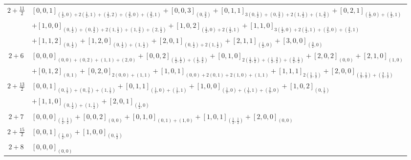 \documentclass[12pt]{article}
\begin{document}
\begin{longtable}{|c|p{}|}
\hline
$2+\frac{11}{2}$ & $[0,0,1]_{(\frac{1}{2},0)+2(\frac{1}{2},1)+(\frac{1}{2},2)+(\frac{3}{2},0)+(\frac{3}{2},1)}+[0,0,3]_{(0,\frac{3}{2})}+[0,1,1]_{3(0,\frac{1}{2})+(0,\frac{3}{2})+2(1,\frac{1}{2})+(1,\frac{3}{2})}+[0,2,1]_{(\frac{1}{2},0)+(\frac{1}{2},1)}$ \\
& $+[1,0,0]_{(0,\frac{1}{2})+(0,\frac{3}{2})+2(1,\frac{1}{2})+(1,\frac{3}{2})+(2,\frac{1}{2})}+[1,0,2]_{(\frac{1}{2},0)+2(\frac{1}{2},1)}+[1,1,0]_{3(\frac{1}{2},0)+2(\frac{1}{2},1)+(\frac{3}{2},0)+(\frac{3}{2},1)}$ \\
& $+[1,1,2]_{(0,\frac{1}{2})}+[1,2,0]_{(0,\frac{1}{2})+(1,\frac{1}{2})}+[2,0,1]_{(0,\frac{1}{2})+2(1,\frac{1}{2})}+[2,1,1]_{(\frac{1}{2},0)}+[3,0,0]_{(\frac{3}{2},0)}$ \\
\hline
$2+6$ & $[0,0,0]_{(0,0)+(0,2)+(1,1)+(2,0)}+[0,0,2]_{(\frac{1}{2},\frac{1}{2})+(\frac{1}{2},\frac{3}{2})}+[0,1,0]_{2(\frac{1}{2},\frac{1}{2})+(\frac{1}{2},\frac{3}{2})+(\frac{3}{2},\frac{1}{2})}+[2,0,2]_{(0,0)}+[2,1,0]_{(1,0)}$ \\
& $+[0,1,2]_{(0,1)}+[0,2,0]_{2(0,0)+(1,1)}+[1,0,1]_{(0,0)+2(0,1)+2(1,0)+(1,1)}+[1,1,1]_{2(\frac{1}{2},\frac{1}{2})}+[2,0,0]_{(\frac{1}{2},\frac{1}{2})+(\frac{3}{2},\frac{1}{2})}$ \\
\hline
$2+\frac{13}{2}$ & $[0,0,1]_{(0,\frac{1}{2})+(0,\frac{3}{2})+(1,\frac{1}{2})}+[0,1,1]_{(\frac{1}{2},0)+(\frac{1}{2},1)}+[1,0,0]_{(\frac{1}{2},0)+(\frac{1}{2},1)+(\frac{3}{2},0)}+[1,0,2]_{(0,\frac{1}{2})}$ \\
& $+[1,1,0]_{(0,\frac{1}{2})+(1,\frac{1}{2})}+[2,0,1]_{(\frac{1}{2},0)}$ \\
\hline
$2+7$ & $[0,0,0]_{(\frac{1}{2},\frac{1}{2})}+[0,0,2]_{(0,0)}+[0,1,0]_{(0,1)+(1,0)}+[1,0,1]_{(\frac{1}{2},\frac{1}{2})}+[2,0,0]_{(0,0)}$ \\
\hline
$2+\frac{15}{2}$ & $[0,0,1]_{(\frac{1}{2},0)}+[1,0,0]_{(0,\frac{1}{2})}$ \\
\hline
$2+8$ & $[0,0,0]_{(0,0)}$ \\
\hline
\end{longtable}
\normalsize
\end{document}
